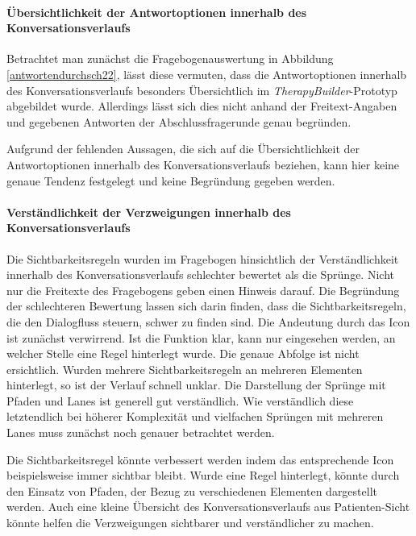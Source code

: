 \paragraph{Übersichtlichkeit der Antwortoptionen innerhalb des Konversationsverlaufs}
Betrachtet man zunächst die Fragebogenauswertung in Abbildung \ref{antwortendurchsch22}, lässt diese vermuten, dass die Antwortoptionen innerhalb des Konversationsverlaufs besonders Übersichtlich im \emph{TherapyBuilder}-Prototyp abgebildet wurde. Allerdings lässt sich dies nicht anhand der Freitext-Angaben und gegebenen Antworten der Abschlussfragerunde genau begründen.

Aufgrund der fehlenden Aussagen, die sich auf die Übersichtlichkeit der Antwortoptionen innerhalb des Konversationsverlaufs beziehen, kann hier keine genaue Tendenz festgelegt und keine Begründung gegeben werden. 

\paragraph{Verständlichkeit der Verzweigungen innerhalb des Konversationsverlaufs}
Die Sichtbarkeitsregeln wurden im Fragebogen hinsichtlich der Verständlichkeit innerhalb des Konversationsverlaufs schlechter bewertet als die Sprünge. Nicht nur die Freitexte des Fragebogens geben einen Hinweis darauf. Die Begründung der schlechteren Bewertung lassen sich darin finden, dass die Sichtbarkeitsregeln, die den Dialogfluss steuern, schwer zu finden sind. Die Andeutung durch das Icon ist zunächst verwirrend. Ist die Funktion klar, kann nur eingesehen werden, an welcher Stelle eine Regel hinterlegt wurde. Die genaue Abfolge ist nicht ersichtlich. Wurden mehrere Sichtbarkeitsregeln an mehreren Elementen hinterlegt, so ist der Verlauf schnell unklar. Die Darstellung der Sprünge mit Pfaden und Lanes ist generell gut verständlich. Wie verständlich diese letztendlich bei höherer Komplexität und vielfachen Sprüngen mit mehreren Lanes muss zunächst noch genauer betrachtet werden. 

Die Sichtbarkeitsregel könnte verbessert werden indem das entsprechende Icon beispielsweise immer sichtbar bleibt. Wurde eine Regel hinterlegt, könnte durch den Einsatz von Pfaden, der Bezug zu verschiedenen Elementen dargestellt werden. Auch eine kleine Übersicht des Konversationsverlaufs aus Patienten-Sicht könnte helfen die Verzweigungen sichtbarer und verständlicher zu machen.

